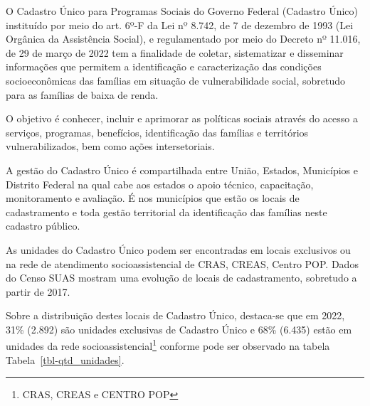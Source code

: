 \documentclass[
  letterpaper,
  DIV=11,
  numbers=noendperiod]{scrreprt}
\begin{document}
O Cadastro Único para Programas Sociais do Governo Federal (Cadastro
Único) instituído por meio do art. 6º-F da Lei nº 8.742, de 7 de
dezembro de 1993 (Lei Orgânica da Assistência Social), e regulamentado
por meio do Decreto nº 11.016, de 29 de março de 2022 tem a finalidade
de coletar, sistematizar e disseminar informações que permitem a
identificação e caracterização das condições socioeconômicas das
famílias em situação de vulnerabilidade social, sobretudo para as
famílias de baixa de renda.

O objetivo é conhecer, incluir e aprimorar as políticas sociais através
do acesso a serviços, programas, benefícios, identificação das famílias
e territórios vulnerabilizados, bem como ações intersetoriais.

A gestão do Cadastro Único é compartilhada entre União, Estados,
Municípios e Distrito Federal na qual cabe aos estados o apoio técnico,
capacitação, monitoramento e avaliação. É nos municípios que estão os
locais de cadastramento e toda gestão territorial da identificação das
famílias neste cadastro público.

As unidades do Cadastro Único podem ser encontradas em locais exclusivos
ou na rede de atendimento socioassistencial de CRAS, CREAS, Centro POP.
Dados do Censo SUAS mostram uma evolução de locais de cadastramento,
sobretudo a partir de 2017.

Sobre a distribuição destes locais de Cadastro Único, destaca-se que em
2022, 31\% (2.892) são unidades exclusivas de Cadastro Único e 68\%
(6.435) estão em unidades da rede socioassistencial\footnote{CRAS, CREAS
  e CENTRO POP} conforme pode ser observado na tabela
Tabela~\ref{tbl-qtd_unidades}.
\end{document}
